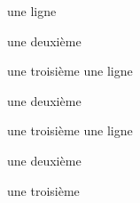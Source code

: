 \documentclass[12pt]{book}
\begin{document}
\beginnumbering
\pstart
une ligne

une deuxième

une troisième
\pend
\pstart
une ligne

une deuxième

une troisième
\pend
\pstart
une ligne

une deuxième

une troisième
\pend
\endnumbering
\end{document}
